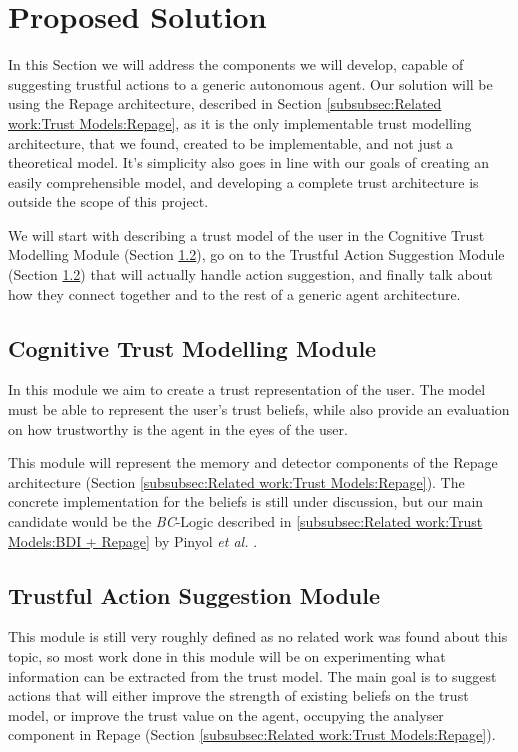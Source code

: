 \section{Proposed Solution}
\label{sec:Solution}
In this Section we will address the components we will develop, capable of suggesting trustful actions to a generic autonomous agent. Our solution will be using the Repage architecture, described in Section \ref{subsubsec:Related work:Trust Models:Repage}, as it is the only implementable trust modelling architecture, that we found, created to be implementable, and not just a theoretical model. It's simplicity also goes in line with our goals of creating an easily comprehensible model, and developing a complete trust architecture is outside the scope of this project.

We will start with describing a trust model of the user in the Cognitive Trust Modelling Module (Section \ref{subsec:Solution:Trust Decision Making Module}), go on to the Trustful Action Suggestion Module (Section \ref{subsec:Solution:Trust Decision Making Module}) that will actually handle action suggestion, and finally talk about how they connect together and to the rest of a generic agent architecture.


\subsection{Cognitive Trust Modelling Module}
\label{subsec:Solution:Trust Assessment Module}
In this module we aim to create a trust representation of the user. The model must be able to represent the user's trust beliefs, while also provide an evaluation on how trustworthy is the agent in the eyes of the user. 

This module will represent the memory and detector components of the Repage architecture (Section \ref{subsubsec:Related work:Trust Models:Repage}). The concrete implementation for the beliefs is still under discussion, but our main candidate would be the \textit{BC}-Logic described in \ref{subsubsec:Related work:Trust Models:BDI + Repage} by Pinyol \textit{et al.} \cite{Pinyol2009}.

\subsection{Trustful Action Suggestion Module}
\label{subsec:Solution:Trust Decision Making Module}
This module is still very roughly defined as no related work was found about this topic, so most work done in this module will be on experimenting what information can be extracted from the trust model. The main goal is to suggest actions that will either improve the strength of existing beliefs on the trust model, or improve the trust value on the agent, occupying the analyser component in Repage (Section \ref{subsubsec:Related work:Trust Models:Repage}).

